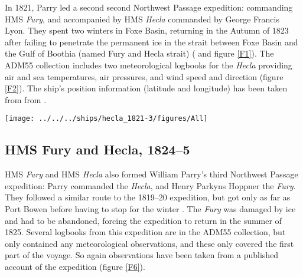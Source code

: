 \documentclass[CP]{copernicus}
\begin{document}
In 1821, Parry led a second second Northwest Passage expedition: commanding HMS {\it Fury}, and accompanied by HMS {\it Hecla} commanded by George Francis Lyon. They spent two winters in Foxe Basin, returning in the Autumn of 1823 after failing to penetrate the permanent ice in the strait between Foxe Basin and the Gulf of Boothia (named Fury and Hecla strait) (\cite{parry_1821} and figure \ref{F1}). The ADM55 collection includes two meteorological logbooks for the {\it Hecla} \citep{hecla_met_log_1821,hecla_met_log_1822-3} providing air and sea temperatures, air pressures, and wind speed and direction (figure \ref{F2}). The ship's position information (latitude and longitude) has been taken from from \citet{hecla_deck_log_1821-3}. 
\begin{figure*}[!hbp]
\begin{center}
\texttt{[image: ../../../ships/hecla\_1821-3/figures/All]}
\caption{Weather observations from HMS {\it Hecla} in 1821--3, compared with modern values. The red points are the expedition's observations, the black and grey lines are the mean, max and min values from modern datasets (monthly averages interpolated to daily, 1979-2004; SST and sea-ice from \citet{rayner03HadISST1}, AT from \citet{rigor97poles}, and pressure from \citet{allan06meansealevelpressure}). The grey bands mark the periods the expedition spent in winter harbours.}
\label{F2}
\end{center}
\end{figure*}

\subsection{HMS Fury and Hecla, 1824--5}

HMS {\it Fury} and HMS {\it Hecla} also formed William Parry's third Northwest Passage expedition: Parry commanded the {\it Hecla}, and Henry Parkyns Hoppner the {\it Fury}. They followed a similar route to the 1819--20 expedition, but got only as far as Port Bowen before having to stop for the winter \citep{parry_1824}. The {\it Fury} was damaged by ice and had to be abandoned, forcing the expedition to return in the summer of 1825. Several logbooks from this expedition are in the ADM55 collection, but only \citet{fury_met_log_1824} contained any meteorological observations, and these only covered the first part of the voyage. So again observations have been taken from a published account of the expedition \citep{parry_1824} (figure \ref{F6}).
\end{document}
